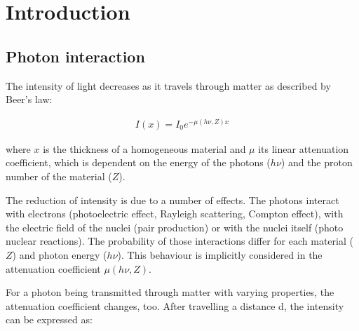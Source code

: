 \chapter{Introduction}
\label{chap:intro}

\section{Photon interaction}
\label{sec:photon}
The intensity of light decreases as it travels through matter as described by Beer's law:

\begin{align}
I(x) = I_0 e^{-\mu(h\nu,Z)x}
\end{align}

where $x$ is the thickness of a homogeneous material and
$\mu$ its linear attenuation coefficient, which is dependent on the energy of the photons ($h\nu$) and the proton number of the material ($Z$).

The reduction of intensity is due to a number of effects. The photons interact with electrons (photoelectric effect, Rayleigh scattering, Compton effect), with the electric field of the nuclei (pair production) or with the nuclei itself (photo nuclear reactions). The probability of those interactions differ for each material ($Z$) and photon energy ($h\nu$). This behaviour is implicitly considered in the attenuation coefficient $\mu(h\nu,Z)$.

For a photon being transmitted through matter with varying properties, the attenuation coefficient changes, too. After travelling a distance d, the intensity can be expressed as:

